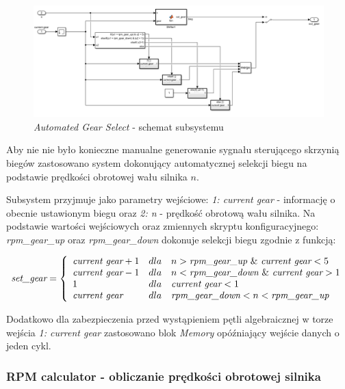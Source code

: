 \documentclass[12pt, a4paper, headings=normal]{article}
\begin{document}
\begin{figure}[H]
	\centering
	\includegraphics[width=\textwidth]{gearselector.png}
	\caption{\textit{Automated Gear Select} - schemat subsystemu}
	\label{fig:autogear}
\end{figure}

Aby nie nie było konieczne manualne generowanie sygnału sterującego skrzynią biegów
zastosowano system dokonujący automatycznej selekcji biegu na podstawie prędkości
obrotowej wału silnika $n$.

Subsystem przyjmuje jako parametry wejściowe: \textit{1: current gear} - informację
o obecnie ustawionym biegu oraz \textit{2: n} - prędkość obrotową wału silnika. Na
podstawie wartości wejściowych oraz zmiennych skryptu konfiguracyjnego: \textit{rpm\_gear\_up} oraz
\textit{rpm\_gear\_down} dokonuje selekcji biegu zgodnie z funkcją:

\begin{equation}
	\textit{set\_gear} = \left\{ \begin{array}{l c l}
		\textit{current gear} + 1 & dla & n > \textit{rpm\_gear\_up} \text{ \& } \textit{current gear} < 5 \\
		\textit{current gear} - 1 & dla & n < \textit{rpm\_gear\_down} \text{ \& } \textit{current gear} > 1 \\
		1 & dla & \textit{current gear} < 1 \\
		\textit{current gear} & dla & \textit{rpm\_gear\_down} < n < \textit{rpm\_gear\_up}
	\end{array}
	\right.	
\end{equation}

Dodatkowo dla zabezpieczenia przed wystąpieniem pętli algebraicznej w torze wejścia
\textit{1: current gear} zastosowano blok \textit{Memory} opóźniający wejście danych o jeden
cykl.

\subsubsection{RPM calculator - obliczanie prędkości obrotowej silnika}
\end{document}
